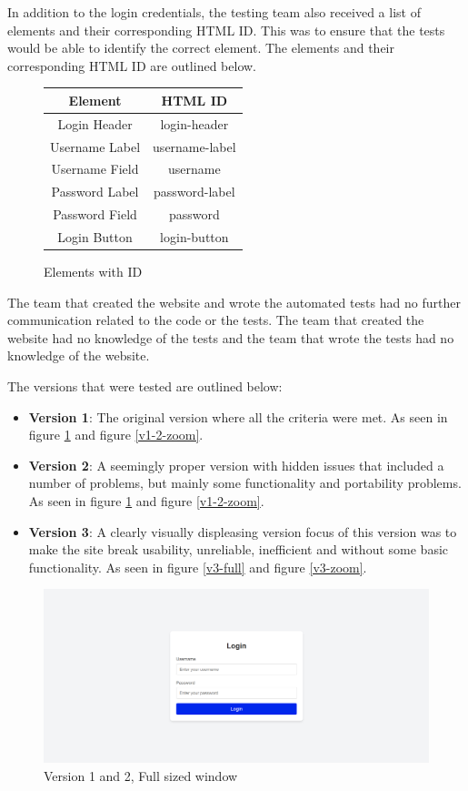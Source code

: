 \documentclass[journal,twocolumn]{IEEEtran}
\begin{document}
In addition to the login credentials, the testing team also received a list of elements and their corresponding HTML ID. This was to ensure that the tests would be able to identify the correct element. The elements and their corresponding HTML ID are outlined below.

\begin{figure}[h!]
    \centering
    \begin{tabular}{|c|c|}
        \hline
        \textbf{Element} & \textbf{HTML ID} \\ \hline
        Login Header     & login-header     \\ \hline
        Username Label   & username-label   \\ \hline
        Username Field   & username         \\ \hline
        Password Label   & password-label   \\ \hline
        Password Field   & password         \\ \hline
        Login Button     & login-button     \\ \hline
    \end{tabular}
    \captionsetup{justification=centering}
    \caption{Elements with ID}
\end{figure}

The team that created the website and wrote the automated tests had no further communication related to the code or the tests. The team that created the website had no knowledge of the tests and the team that wrote the tests had no knowledge of the website.

The versions that were tested are outlined below:
\begin{itemize}
    \item \textbf{Version 1}: The original version where all the criteria were met. As seen in figure \ref{v1-2-full} and figure \ref{v1-2-zoom}.
    \item \textbf{Version 2}: A seemingly proper version with hidden issues that included a number of problems, but mainly some functionality and portability problems. As seen in figure \ref{v1-2-full} and figure \ref{v1-2-zoom}.
    \item \textbf{Version 3}: A clearly visually displeasing version focus of this version was to make the site break usability, unreliable, inefficient and without some basic functionality. As seen in figure \ref{v3-full} and figure \ref{v3-zoom}.
\end{itemize}

\begin{figure}[H]
    \centering
    \includegraphics[width=0.6\linewidth]{login-full-size.png}
    \caption{Version 1 and 2, Full sized window}
    \label{v1-2-full}
\end{figure}
\end{document}
